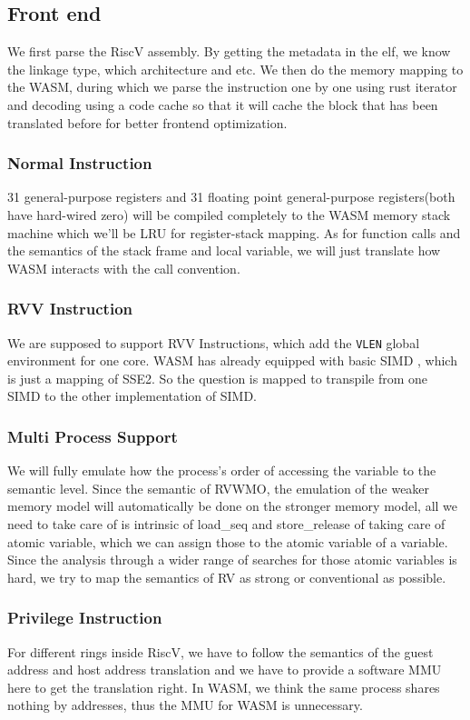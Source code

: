 \documentclass{article}
\newcommand{\code}[1]{\texttt{#1}}
\begin{document}
\subsection{Front end}
We first parse the RiscV assembly. By getting the metadata in the elf, we know the linkage type, which architecture and etc. We then do the memory mapping to the WASM, during which we parse the instruction one by one using rust iterator and decoding using a code cache so that it will cache the block that has been translated before for better frontend optimization.
\subsubsection{Normal Instruction}
31 general-purpose registers and 31 floating point general-purpose registers(both have hard-wired zero) will be compiled completely to the WASM memory stack machine which we'll be LRU for register-stack mapping. As for function calls and the semantics of the stack frame and local variable, we will just translate how WASM interacts with the call convention.
\subsubsection{RVV Instruction}
We are supposed to support RVV Instructions, which add the \code{VLEN} global environment for one core. WASM has already equipped with basic SIMD \cite{wasm-simd}, which is just a mapping of SSE2. So the question is mapped to transpile from one SIMD to the other implementation of SIMD.
\subsubsection{Multi Process Support}
We will fully emulate how the process's order of accessing the variable to the semantic level. Since the semantic of RVWMO, the emulation of the weaker memory model will automatically be done on the stronger memory model, all we need to take care of is intrinsic of load\_seq and store\_release of taking care of atomic variable, which we can assign those to the atomic variable of a variable. Since the analysis through a wider range of searches for those atomic variables is hard, we try to map the semantics of RV as strong or conventional as possible.
\subsubsection{Privilege Instruction}
For different rings inside RiscV, we have to follow the semantics of the guest address and host address translation and we have to provide a software MMU here to get the translation right. In WASM, we think the same process shares nothing by addresses, thus the MMU for WASM is unnecessary.
\end{document}

